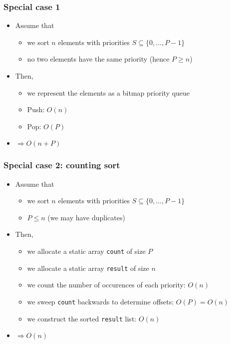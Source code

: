 \documentclass[12pt]{article}
\begin{document}
\subsubsection{Special case 1}
\begin{itemize}
    \item Assume that
    \begin{itemize}
        \item we sort $n$ elements with priorities $S \subseteq \{0, \ldots, P - 1\}$
        \item no two elements have the same priority (hence $P \geq n$)
    \end{itemize}
    \item Then,
    \begin{itemize}
        \item we represent the elements as a bitmap priority queue
        \item Push: $O(n)$
        \item Pop: $O(P)$
    \end{itemize}
    \item[] $\Rightarrow O(n + P)$
\end{itemize}

\subsubsection{Special case 2: counting sort}
\begin{itemize}
    \item Assume that
    \begin{itemize}
        \item we sort $n$ elements with priorities $S \subseteq \{0, \ldots, P - 1\}$
        \item $P \leq n$ (we may have duplicates)
    \end{itemize}
    \item Then,
    \begin{itemize}
        \item we allocate a static array \texttt{count} of size $P$
        \item we allocate a static array \texttt{result} of size $n$
        \item we count the number of occurences of each priority: $O(n)$
        \item we sweep \texttt{count} backwards to determine offsets: $O(P) = O(n)$
        \item we construct the sorted \texttt{result} list: $O(n)$
    \end{itemize}
    \item[] $\Rightarrow O(n)$
\end{itemize}
\end{document}
